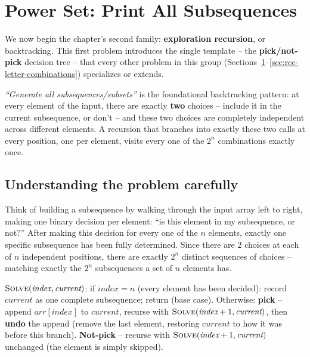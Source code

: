 \section{Power Set: Print All Subsequences}
\label{sec:rec-power-set}

\noindent We now begin the chapter's second family: \textbf{exploration
recursion}, or backtracking. This first problem introduces the single
template -- the \textbf{pick/not-pick} decision tree -- that every other
problem in this group (Sections~\ref{sec:rec-power-set}--\ref{sec:rec-letter-combinations})
specializes or extends.


\begin{patternbox}
\emph{``Generate all subsequences/subsets''} is the foundational
backtracking pattern: at every element of the input, there are exactly
\textbf{two} choices -- include it in the current subsequence, or
don't -- and these two choices are completely independent across
different elements. A recursion that branches into exactly these two
calls at every position, one per element, visits every one of the
$2^n$ combinations exactly once.
\end{patternbox}

\subsection*{Understanding the problem carefully}

Think of building a subsequence by walking through the input array left
to right, making one binary decision per element: ``is this element in
my subsequence, or not?'' After making this decision for every one of
the $n$ elements, exactly one specific subsequence has been fully
determined. Since there are $2$ choices at each of $n$ independent
positions, there are exactly $2^n$ distinct sequences of choices --
matching exactly the $2^n$ subsequences a set of $n$ elements has.

\begin{ideabox}
$\textsc{Solve}(\textit{index}, \textit{current})$: if
$\textit{index} = n$ (every element has been decided): record
$\textit{current}$ as one complete subsequence; return (base case).
Otherwise: \textbf{pick} -- append $\textit{arr}[\textit{index}]$ to
$\textit{current}$, recurse with $\textsc{Solve}(\textit{index}+1,
\textit{current})$, then \textbf{undo} the append (remove the last
element, restoring $\textit{current}$ to how it was before this branch).
\textbf{Not-pick} -- recurse with $\textsc{Solve}(\textit{index}+1,
\textit{current})$ unchanged (the element is simply skipped).
\end{ideabox}

